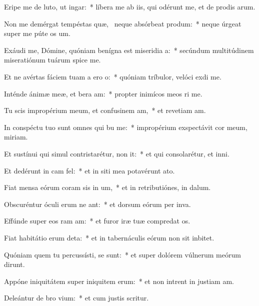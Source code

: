 \item Eripe me de luto, ut  ingar:~* líbera me ab iis, qui odérunt me, et de prodis arum.
\item Non me demérgat tempéstas quæ,~\pscross{} neque absórbeat  produm:~* neque úrgeat super me púte os um.
\item Exáudi me, Dómine, quóniam benígna est miseridia a:~* secúndum multitúdinem miseratiónum tuárum spice  me.
\item Et ne avértas fáciem tuam a ero o:~* quóniam tríbulor, velóci exdi me.
\item Inténde ánimæ meæ, et bera am:~* propter inimícos meos ri me.
\item Tu scis impropérium meum, et confusinem am,~* et revetiam am.
\item In conspéctu tuo sunt omnes qui bu me:~* impropérium exspectávit cor meum,  miriam.
\item Et sustínui qui simul contristarétur,  non it:~* et qui consolarétur, et  inni.
\item Et dedérunt in cam  fel:~* et in siti mea potavérunt  ato.
\item Fiat mensa eórum coram sis in um,~* et in retributiónes,  in dalum.
\item Obscuréntur óculi erum ne ant:~* et dorsum eórum per inva.
\item Effúnde super eos ram am:~* et furor iræ tuæ compredat os.
\item Fiat habitátio erum deta:~* et in tabernáculis eórum non sit  inbitet.
\item Quóniam quem tu percussísti, se sunt:~* et super dolórem vúlnerum meórum dirunt.
\item Appóne iniquitátem super iniquitem erum:~* et non intrent in justiam am.
\item Deleántur de bro vium:~* et cum justis  scritur.
